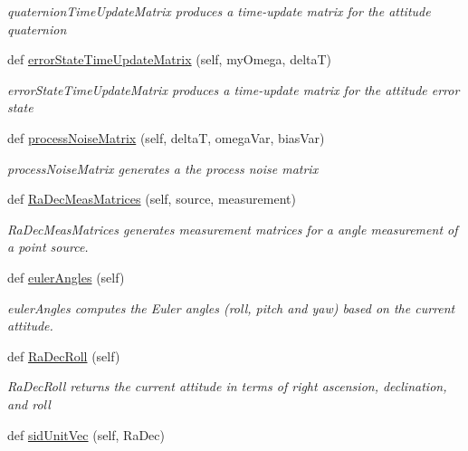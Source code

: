 \begin{DoxyCompactItemize}
\begin{DoxyCompactList}\small\item\em quaternion\+Time\+Update\+Matrix produces a time-\/update matrix for the attitude quaternion \end{DoxyCompactList}\item 
def \hyperlink{classAttitudeSubstate_1_1AttitudeState6DOF_a98463a04f2b7f78389d7cce944139afd}{error\+State\+Time\+Update\+Matrix} (self, my\+Omega, deltaT)
\begin{DoxyCompactList}\small\item\em error\+State\+Time\+Update\+Matrix produces a time-\/update matrix for the attitude error state \end{DoxyCompactList}\item 
def \hyperlink{classAttitudeSubstate_1_1AttitudeState6DOF_abc5b2c8345bcd948d35b438fce184dee}{process\+Noise\+Matrix} (self, deltaT, omega\+Var, bias\+Var)
\begin{DoxyCompactList}\small\item\em process\+Noise\+Matrix generates a the process noise matrix \end{DoxyCompactList}\item 
def \hyperlink{classAttitudeSubstate_1_1AttitudeState6DOF_a3292931688716329fb80cbeac83f7ee7}{Ra\+Dec\+Meas\+Matrices} (self, source, measurement)
\begin{DoxyCompactList}\small\item\em Ra\+Dec\+Meas\+Matrices generates measurement matrices for a angle measurement of a point source. \end{DoxyCompactList}\item 
def \hyperlink{classAttitudeSubstate_1_1AttitudeState6DOF_a34f52f0e701e78ba8e92bff57f56110d}{euler\+Angles} (self)
\begin{DoxyCompactList}\small\item\em euler\+Angles computes the Euler angles (roll, pitch and yaw) based on the current attitude. \end{DoxyCompactList}\item 
def \hyperlink{classAttitudeSubstate_1_1AttitudeState6DOF_a4728d7547aee8612fdd5e2875a37f8a2}{Ra\+Dec\+Roll} (self)
\begin{DoxyCompactList}\small\item\em Ra\+Dec\+Roll returns the current attitude in terms of right ascension, declination, and roll \end{DoxyCompactList}\item 
def \hyperlink{classAttitudeSubstate_1_1AttitudeState6DOF_ae5afc5e0352e10e5c11e45d5b3fa8f4e}{sid\+Unit\+Vec} (self, Ra\+Dec)

\end{DoxyCompactItemize}
